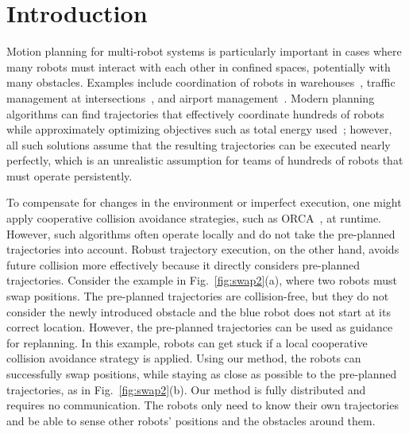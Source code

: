 \documentclass{svproc}
\begin{document}
\section{Introduction}
Motion planning for multi-robot systems is particularly important in cases where many robots must interact with each other in confined spaces, potentially with many obstacles.
Examples include coordination of robots in warehouses~\cite{Kiva}, traffic management at intersections~\cite{IntersectionManagementDresner}, and airport management~\cite{AirportTug}.
Modern planning algorithms can find trajectories that effectively coordinate hundreds of robots while approximately optimizing objectives such as total energy used~\cite{crazyplanning-ieeetro};
however, all such solutions assume that the resulting trajectories can be executed nearly perfectly, which is an unrealistic assumption for teams of hundreds of robots that must operate persistently.%

To compensate for changes in the environment or imperfect execution, one might apply cooperative collision avoidance strategies, such as ORCA~\cite{orca}, at runtime.
However, such algorithms often operate locally and do not take the pre-planned trajectories into account.
Robust trajectory execution, on the other hand, avoids future collision more effectively because it directly considers pre-planned trajectories.
Consider the example in Fig.~\ref{fig:swap2}(a), where two robots must swap positions.
The pre-planned trajectories are collision-free, but they do not consider the newly introduced obstacle and the blue robot does not start at its correct location.
However, the pre-planned trajectories can be used as guidance for replanning.
In this example, robots can get stuck if a local cooperative collision avoidance strategy is applied.
Using our method, the robots can successfully swap positions, while staying as close as possible to the pre-planned trajectories, as in Fig.~\ref{fig:swap2}(b).
Our method is fully distributed and requires no communication. The robots only need to know their own trajectories and be able to sense other robots' positions and the obstacles around them.
\end{document}
